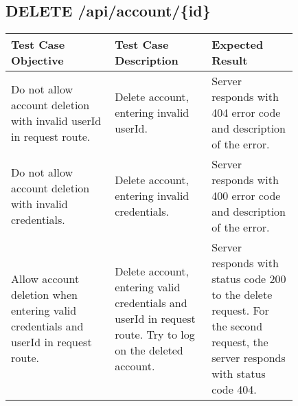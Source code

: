 \subsection{DELETE \slash api\slash account\slash \{id\}}
\begin{longtable}{p{0.30\linewidth}p{0.28\linewidth}p{0.25\linewidth}}
	\toprule
	\textbf{Test Case Objective}   & \textbf{Test Case Description} & \textbf{Expected Result}\\
	\midrule
	Do not allow account deletion with invalid userId in request route. & Delete account, entering invalid userId. &  Server responds with 404 error code and description of the error.\\
	\midrule
	Do not allow account deletion with invalid credentials. & Delete account, entering invalid credentials. &  Server responds with 400 error code and description of the error.\\
	\midrule
	Allow account deletion when entering valid credentials and userId in request route. & Delete account, entering valid credentials and userId in request route. Try to log on the deleted account. &  Server responds with status code 200 to the delete request. For the second request, the server responds with status code 404.\\
	\bottomrule
\end{longtable}


